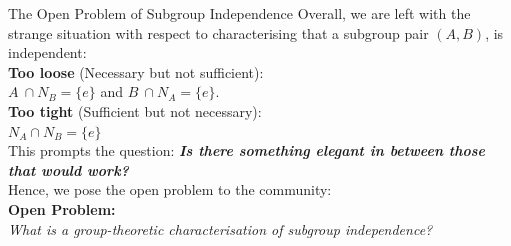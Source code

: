 \documentclass{article}
\begin{document}
\begin{section}{The Open Problem of Subgroup Independence}
		Overall, we are left with the strange situation with respect to characterising that a subgroup pair  $(A, B)$, is independent:\\
		
		\noindent \textbf{Too loose} (Necessary but not sufficient): \\ $A \  \cap  N_B  = \{e\}$ and $B \  \cap N_A  = \{e\}$.\\
		
		\noindent \textbf{Too tight} (Sufficient but not necessary):\\ $N_A  \cap  N_B  = \{e\}$\\
		
		\noindent This prompts the question: \textit{\textbf{Is there something elegant in between those that would work?}}\\
		
		\noindent Hence, we pose the open problem to the community:\\
		
		\noindent \textbf{Open Problem:}\\ 
		
		\noindent \textit{What is a group-theoretic characterisation of subgroup independence?}\\
		
		
	\end{section}
	
	
	
	
	

	
	
	
	
\end{document}
